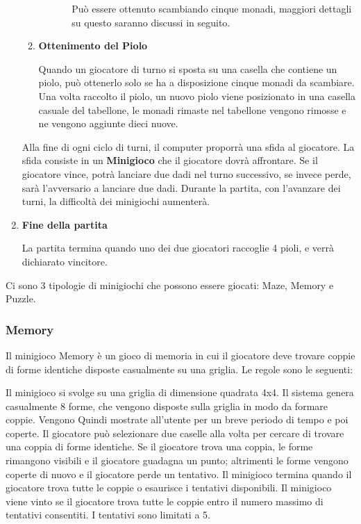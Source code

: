 \begin{enumerate}
\begin{enumerate}
\begin{itemize}
\begin{itemize}
                Può essere ottenuto scambiando cinque monadi, maggiori dettagli
                su questo saranno discussi in seguito.
            \end{itemize}
        \end{itemize}
        \item \textbf{Ottenimento del Piolo}\par
        Quando un giocatore di turno si sposta su una casella che contiene un piolo, 
        può ottenerlo solo se ha a disposizione cinque monadi da scambiare. Una volta raccolto il piolo,
        un nuovo piolo viene posizionato in una casella casuale del tabellone, le monadi
        rimaste nel tabellone vengono rimosse e ne vengono aggiunte dieci nuove.
    \end{enumerate}
    Alla fine di ogni ciclo di turni, il computer proporrà una sfida al giocatore.
    La sfida consiste in un \textbf{Minigioco} che il giocatore dovrà affrontare.
    Se il giocatore vince, potrà lanciare due dadi nel turno successivo, 
    se invece perde, sarà l'avversario a lanciare due dadi. Durante la partita,
    con l'avanzare dei turni, la difficoltà dei minigiochi aumenterà.
    \item \textbf{Fine della partita}\par
    La partita termina quando uno dei due giocatori raccoglie 4 pioli,
    e verrà dichiarato vincitore.
\end{enumerate}

Ci sono 3 tipologie di minigiochi che possono essere giocati: Maze, Memory e Puzzle.
\subsubsection{Memory}
Il minigioco Memory è un gioco di memoria in cui il giocatore deve trovare coppie di forme identiche
disposte casualmente su una griglia. Le regole sono le seguenti:

Il minigioco si svolge su una griglia di dimensione quadrata 4x4. Il sistema genera casualmente 8 forme, che vengono disposte
sulla griglia in modo da formare coppie. Vengono Quindi mostrate all'utente per un breve periodo di tempo e poi coperte. Il
giocatore può selezionare due caselle alla volta per cercare di trovare una coppia di forme identiche. Se il giocatore trova una
coppia, le forme rimangono visibili e il giocatore guadagna un punto; altrimenti le forme vengono coperte di nuovo e il giocatore
perde un tentativo. Il minigioco termina quando il giocatore trova tutte le coppie o esaurisce i tentativi disponibili. Il minigioco
viene vinto se il giocatore trova tutte le coppie entro il numero massimo di tentativi consentiti. I tentativi sono limitati a 5.



